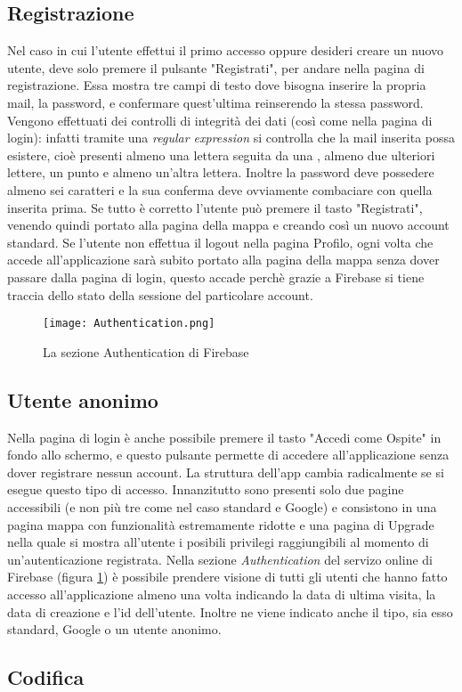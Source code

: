 \subsection{Registrazione}
Nel caso in cui l'utente effettui il primo accesso oppure desideri creare un
nuovo utente, deve solo premere il pulsante "Registrati", per andare nella
pagina di registrazione. Essa mostra tre campi di testo dove bisogna inserire la
propria mail, la password, e confermare quest'ultima reinserendo la stessa
password. Vengono effettuati dei controlli di integrità dei dati (così come
nella pagina di login): infatti tramite una \textit{regular expression} si
controlla che la mail inserita possa esistere, cioè presenti almeno una
lettera seguita da una \MVAt, almeno due ulteriori lettere, un punto e almeno un'altra
lettera. Inoltre la password deve possedere almeno sei caratteri e la sua
conferma deve ovviamente combaciare con quella inserita prima. Se tutto è
corretto l'utente può premere il tasto "Registrati", venendo quindi portato alla
pagina della mappa e creando così un nuovo account standard. \newline
Se l'utente non effettua il logout nella pagina Profilo, ogni volta che accede
all'applicazione sarà subito portato alla pagina della mappa senza dover passare
dalla pagina di login, questo accade perchè grazie a Firebase si tiene traccia
dello stato della sessione del particolare account.

\begin{figure}[h!]
    \centering
    \texttt{[image: Authentication.png]}
    \caption{La sezione Authentication di Firebase}
    \label{authentication}
\end{figure}

\subsection{Utente anonimo}
Nella pagina di login è anche possibile premere il tasto "Accedi come Ospite" in
fondo allo schermo, e questo pulsante permette di accedere all'applicazione
senza dover registrare nessun account. La struttura dell'app cambia radicalmente
se si esegue questo tipo di accesso. Innanzitutto sono presenti solo due pagine
accessibili (e non più tre come nel caso standard e Google) e consistono in una
pagina mappa con funzionalità estremamente ridotte e una pagina di Upgrade nella
quale si mostra all'utente i posibili privilegi raggiungibili al momento di
un'autenticazione registrata. Nella sezione \textit{Authentication} del servizo
online di Firebase (figura \ref{authentication}) è possibile prendere visione di tutti gli utenti che hanno
fatto accesso all'applicazione almeno una volta indicando la data di ultima
visita, la data di creazione e l'id dell'utente. Inoltre ne viene indicato anche
il tipo, sia esso standard, Google o un utente anonimo.

\subsection{Codifica}
